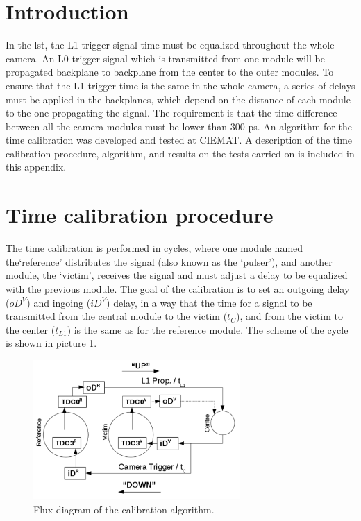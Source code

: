 \documentclass[main.tex]{subfiles}
\begin{document}
\glsresetall

\section{Introduction}

In the \gls{lst}, the L1 trigger signal time must be equalized throughout the whole camera. An L0 trigger signal which is transmitted from one module will be propagated backplane to backplane from the center to the outer modules. To ensure that the L1 trigger time is the same in the whole camera, a series of delays must be applied in the backplanes, which depend on the distance of each module to the one propagating the signal. The requirement is that the time difference between all the camera modules must be lower than 300 ps. An algorithm for the time calibration was developed and tested at CIEMAT. A description of the time calibration procedure, algorithm, and results on the tests carried on is included in this appendix.

\section{Time calibration procedure}

The time calibration is performed in cycles, where one module named the`reference' distributes the signal (also known as the `pulser'), and another module, the `victim', receives the signal and must adjust a delay to be equalized with the previous module. The goal of the calibration is to set an outgoing delay ($oD^{V}$) and ingoing ($iD^{V}$) delay, in a way that the time for a signal to be transmitted from the central module to the victim ($t_{C}$), and from the victim to the center ($t_{L1}$) is the same as for the reference module. The scheme of the cycle is shown in picture \ref{fig:calibcicle}.

\begin{figure}[h]
  \centering
  \includegraphics[width=0.7\textwidth]{./Pictures/timecalib.pdf}
  \caption{Flux diagram of the calibration algorithm.}
  \label{fig:calibcicle}
\end{figure}
\end{document}
